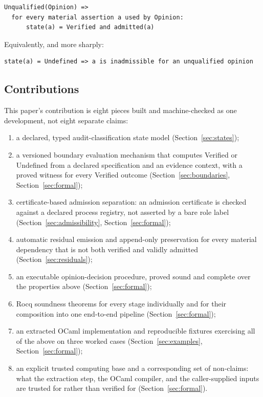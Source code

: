 \documentclass[smallcondensed,envcountsect,natbib]{svjour3}
\newcommand{\state}[1]{\textsf{#1}}
\begin{document}
\begin{lstlisting}
Unqualified(Opinion) =>
  for every material assertion a used by Opinion:
      state(a) = Verified and admitted(a)
\end{lstlisting}

Equivalently, and more sharply:

\begin{lstlisting}
state(a) = Undefined => a is inadmissible for an unqualified opinion
\end{lstlisting}

\subsection*{Contributions}

This paper's contribution is eight pieces built and machine-checked as one development, not eight separate claims:

\begin{enumerate}
\item a declared, typed audit-classification state model (Section~\ref{sec:states});
\item a versioned boundary evaluation mechanism that computes \state{Verified} or \state{Undefined} from a declared specification and an evidence context, with a proved witness for every \state{Verified} outcome (Section~\ref{sec:boundaries}, Section~\ref{sec:formal});
\item certificate-based admission separation: an admission certificate is checked against a declared process registry, not asserted by a bare role label (Section~\ref{sec:admissibility}, Section~\ref{sec:formal});
\item automatic residual emission and append-only preservation for every material dependency that is not both verified and validly admitted (Section~\ref{sec:residuals});
\item an executable opinion-decision procedure, proved sound and complete over the properties above (Section~\ref{sec:formal});
\item Rocq soundness theorems for every stage individually and for their composition into one end-to-end pipeline (Section~\ref{sec:formal});
\item an extracted OCaml implementation and reproducible fixtures exercising all of the above on three worked cases (Section~\ref{sec:examples}, Section~\ref{sec:formal});
\item an explicit trusted computing base and a corresponding set of non-claims: what the extraction step, the OCaml compiler, and the caller-supplied inputs are trusted for rather than verified for (Section~\ref{sec:formal}).
\end{enumerate}
\end{document}
